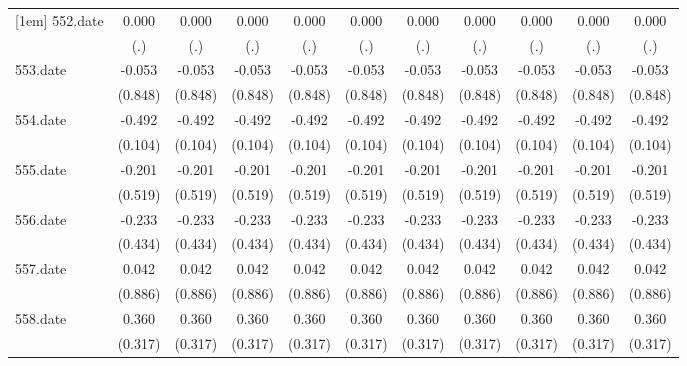 \begin{tabular}{l*{10}{c}}
[1em]
552.date    &       0.000&       0.000&       0.000&       0.000&       0.000&       0.000&       0.000&       0.000&       0.000&       0.000\\
            &         (.)&         (.)&         (.)&         (.)&         (.)&         (.)&         (.)&         (.)&         (.)&         (.)\\
[1em]
553.date    &      -0.053&      -0.053&      -0.053&      -0.053&      -0.053&      -0.053&      -0.053&      -0.053&      -0.053&      -0.053\\
            &     (0.848)&     (0.848)&     (0.848)&     (0.848)&     (0.848)&     (0.848)&     (0.848)&     (0.848)&     (0.848)&     (0.848)\\
[1em]
554.date    &      -0.492&      -0.492&      -0.492&      -0.492&      -0.492&      -0.492&      -0.492&      -0.492&      -0.492&      -0.492\\
            &     (0.104)&     (0.104)&     (0.104)&     (0.104)&     (0.104)&     (0.104)&     (0.104)&     (0.104)&     (0.104)&     (0.104)\\
[1em]
555.date    &      -0.201&      -0.201&      -0.201&      -0.201&      -0.201&      -0.201&      -0.201&      -0.201&      -0.201&      -0.201\\
            &     (0.519)&     (0.519)&     (0.519)&     (0.519)&     (0.519)&     (0.519)&     (0.519)&     (0.519)&     (0.519)&     (0.519)\\
[1em]
556.date    &      -0.233&      -0.233&      -0.233&      -0.233&      -0.233&      -0.233&      -0.233&      -0.233&      -0.233&      -0.233\\
            &     (0.434)&     (0.434)&     (0.434)&     (0.434)&     (0.434)&     (0.434)&     (0.434)&     (0.434)&     (0.434)&     (0.434)\\
[1em]
557.date    &       0.042&       0.042&       0.042&       0.042&       0.042&       0.042&       0.042&       0.042&       0.042&       0.042\\
            &     (0.886)&     (0.886)&     (0.886)&     (0.886)&     (0.886)&     (0.886)&     (0.886)&     (0.886)&     (0.886)&     (0.886)\\
[1em]
558.date    &       0.360&       0.360&       0.360&       0.360&       0.360&       0.360&       0.360&       0.360&       0.360&       0.360\\
            &     (0.317)&     (0.317)&     (0.317)&     (0.317)&     (0.317)&     (0.317)&     (0.317)&     (0.317)&     (0.317)&     (0.317)\\

\end{tabular}
